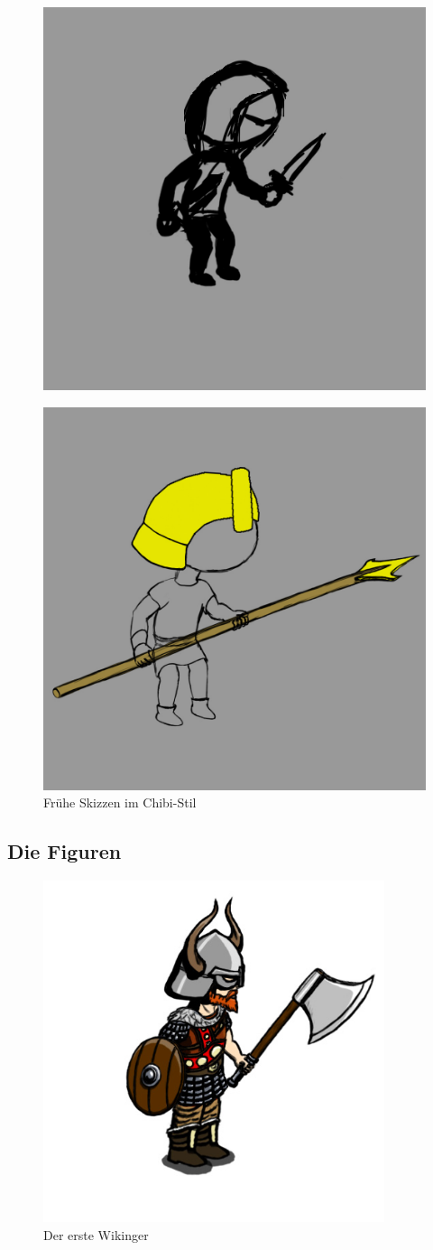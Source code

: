 \documentclass[extern,palatino]{cgBA}
\begin{document}
\begin{figure}[H]
	\centering
	\includegraphics[width=.5\textwidth]{assachibi.jpg}
\end{figure}
\begin{figure}[H]
	\centering
	\includegraphics[width=.5\textwidth]{egychibi.jpg}
	\caption{Frühe Skizzen im Chibi-Stil}
	\label{earlydesign}
\end{figure}
\newpage
\subsection{Die Figuren}
\begin{figure}[H]
	\centering
	\includegraphics[height=10cm]{viking.jpg}
	\caption{Der erste Wikinger}
	\label{viking}
\end{figure}
\end{document}
